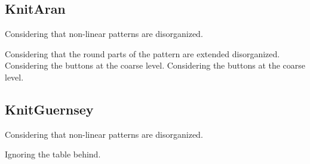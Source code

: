 \clearpage
\renewcommand{\matName}{KnitAran}
\subsection{\matName}
Considering that non-linear patterns are disorganized.

\renewcommand{\imgNumber}{01}
{}{}
\renewcommand{\imgNumber}{02}
{}{}
\renewcommand{\imgNumber}{03}
{}{Considering that the round parts of the pattern are extended disorganized.}
\renewcommand{\imgNumber}{04}
{}{Considering the buttons at the coarse level.}
\renewcommand{\imgNumber}{05}
{}{}
\renewcommand{\imgNumber}{06}
{}{}
\renewcommand{\imgNumber}{07}
{}{}
\renewcommand{\imgNumber}{08}
{}{}
\renewcommand{\imgNumber}{09}
{}{}
\renewcommand{\imgNumber}{10}
{}{}
\renewcommand{\imgNumber}{11}
{}{Considering the buttons at the coarse level.}
\renewcommand{\imgNumber}{12}
{}{}

\clearpage
\renewcommand{\matName}{KnitGuernsey}
\subsection{\matName}
Considering that non-linear patterns are disorganized.

\renewcommand{\imgNumber}{01}
{}{}
\renewcommand{\imgNumber}{02}
{}{Ignoring the table behind.}
\renewcommand{\imgNumber}{03}
{}{}
\renewcommand{\imgNumber}{04}
{}{}
\renewcommand{\imgNumber}{05}
{}{}
\renewcommand{\imgNumber}{06}
{}{}
\renewcommand{\imgNumber}{07}
{}{}
\renewcommand{\imgNumber}{08}
{}{}
\renewcommand{\imgNumber}{09}
{}{}
\renewcommand{\imgNumber}{10}
{}{}
\renewcommand{\imgNumber}{11}
{}{}
\renewcommand{\imgNumber}{12}
{}{}

